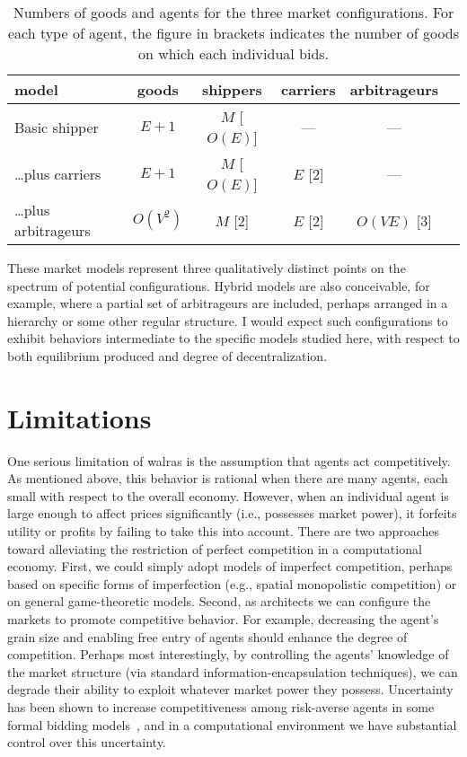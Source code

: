 \begin{table*}[htbp]
\begin{center}
\begin{tabular}{l|ccccc}
model & goods & shippers & carriers & arbitrageurs & \\\hline
Basic shipper & $E+1$ & $M$ [$O(E)$] & --- & --- \\
\ldots plus carriers & $E+1$ & $M$ [$O(E)$] & $E$ [2] & --- \\
\ldots plus arbitrageurs & $O(V^2)$ & $M$ [2] & $E$ [2] & $O(VE)$ [3] \\
\end{tabular}
\end{center}
\caption{Numbers of goods and agents for the three market
configurations.  For each type of agent, the figure
in brackets indicates the number of goods on which each individual bids.}
\label{t-summary}
\end{table*}

These market models represent three qualitatively distinct points on the 
spectrum of potential configurations.  Hybrid models are 
also conceivable, for example, where a partial set of arbitrageurs are 
included, perhaps arranged in a hierarchy or some other regular 
structure.  I would expect such configurations to exhibit 
behaviors intermediate to the specific models studied here, with respect 
to both equilibrium produced and degree of decentralization.

\section{Limitations}\label{s-limits}

One serious limitation of {\sc walras} is the assumption that agents act
competitively.
As mentioned above, this behavior is rational when there are many agents, 
each small with respect to the overall economy.
However, when an individual agent is large enough to affect prices significantly
(i.e., possesses market power), it forfeits utility or profits by failing to
take this into account.
There are two approaches toward alleviating the restriction of perfect
competition in a computational economy.
First, we could simply adopt models of imperfect competition, perhaps 
based on specific forms of imperfection (e.g., spatial monopolistic competition) 
or on general game-theoretic models.
Second, as architects we can configure the 
markets to promote competitive behavior.
For example, decreasing the agent's grain size and enabling free 
entry of agents should enhance the degree of competition.
Perhaps most interestingly, by controlling the agents' knowledge of the 
market structure (via standard information-encapsulation techniques), we 
can degrade their ability to exploit whatever market power they possess.
Uncertainty has been shown to increase competitiveness among risk-averse 
agents in some formal bidding models~\cite{McAfee87}, and in
a computational environment we have substantial control over this uncertainty.

